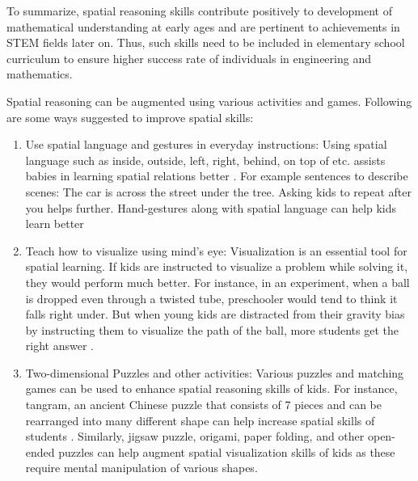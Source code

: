 To summarize, spatial reasoning skills contribute positively to development of mathematical understanding at early ages and are pertinent to achievements in STEM fields later on. Thus, such skills need to be included in elementary school curriculum to ensure higher success rate of individuals in engineering and mathematics. 

Spatial reasoning can be augmented using various activities and games. Following are some ways suggested to improve spatial skills:
\begin{enumerate}
    \item Use spatial language and gestures in everyday instructions: Using spatial language such as inside, outside, left, right, behind, on top of etc. assists babies in learning spatial relations better \parencite{casasola2008development}. For example sentences to describe scenes: The car is across the street under the tree. Asking kids to repeat after you helps further. Hand-gestures along with spatial language can help kids learn better \parencite{singer2005children}
    \item Teach how to visualize using mind's eye: Visualization is an essential tool for spatial learning. If kids are instructed to visualize a problem while solving it, they would perform much better. For instance, in an experiment, when a ball is dropped even through a twisted tube, preschooler would tend to think it falls right under. But when young kids are distracted from their gravity bias by instructing them to visualize the path of the ball, more students get the right answer \parencite{joh2011imagining}.
    \item Two-dimensional Puzzles and other activities: Various puzzles and matching games can be used to enhance spatial reasoning skills of kids. For instance, tangram, an ancient Chinese puzzle that consists of 7 pieces and can be rearranged into many different shape can help increase spatial skills of students \parencite{siew2013facilitating}.  Similarly, jigsaw puzzle, origami, paper folding, and other open-ended puzzles can help augment spatial visualization skills of kids as these require mental manipulation of various shapes. 

\end{enumerate}
